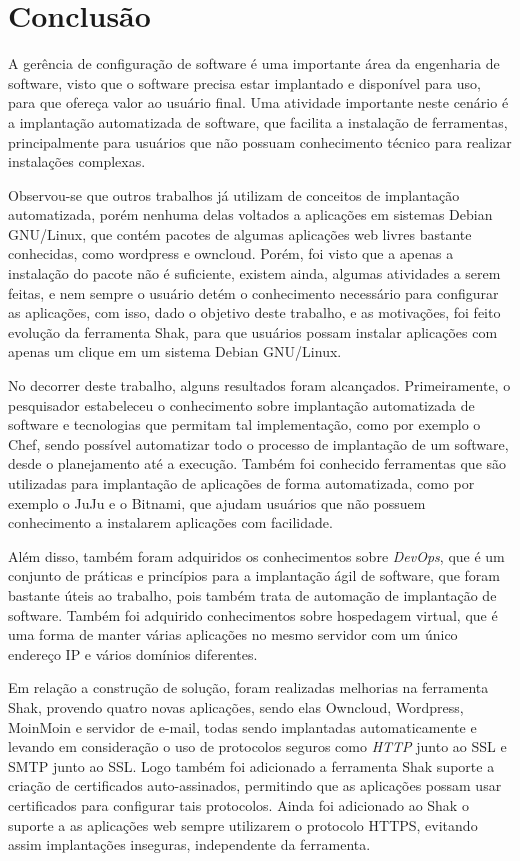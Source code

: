 \chapter{Conclusão}
\label{cap-conclusoes}

A gerência de configuração de software é uma importante área da engenharia de software,
visto que o software precisa estar implantado e disponível para uso, para que ofereça 
valor ao usuário final. Uma atividade importante neste cenário é a implantação
automatizada de software, que facilita a instalação de ferramentas, principalmente
para usuários que não possuam conhecimento técnico para realizar instalações complexas.

Observou-se que outros trabalhos já utilizam de conceitos de implantação automatizada,
porém nenhuma delas voltados a aplicações em sistemas Debian GNU/Linux, que contém
pacotes de algumas aplicações web livres bastante conhecidas, como wordpress e
owncloud. Porém, foi visto que a apenas a instalação do pacote não é suficiente, 
existem ainda, algumas atividades a serem feitas, e nem sempre o usuário detém
o conhecimento necessário para configurar as aplicações, com isso, dado o objetivo
deste trabalho, e as motivações, foi feito evolução da ferramenta Shak, para 
que usuários possam instalar aplicações com apenas um clique em um sistema Debian
GNU/Linux.

No decorrer deste trabalho, alguns resultados foram alcançados. Primeiramente, o
pesquisador estabeleceu o conhecimento sobre implantação automatizada
de software e tecnologias que permitam tal implementação, como por exemplo o Chef, 
sendo possível automatizar todo o processo de implantação de um software,
desde o planejamento até a execução. Também foi conhecido ferramentas que são
utilizadas para implantação de aplicações de forma automatizada, como por exemplo
o JuJu e o Bitnami, que ajudam usuários que não possuem conhecimento a
instalarem aplicações com facilidade.

Além disso, também foram adquiridos os conhecimentos sobre \textit{DevOps}, que é um conjunto
de práticas e princípios para a implantação ágil de software, que foram bastante 
úteis ao trabalho, pois também trata de automação de implantação de software. Também 
foi adquirido conhecimentos sobre hospedagem virtual, que é uma forma de manter
várias aplicações no mesmo servidor com um único endereço IP e vários domínios diferentes.

Em relação a construção de solução, foram realizadas melhorias na ferramenta Shak,
provendo quatro novas aplicações, sendo elas Owncloud, Wordpress, MoinMoin e 
servidor de e-mail, todas sendo implantadas automaticamente e 
levando em consideração o uso de protocolos seguros como \textit{HTTP} junto ao SSL e SMTP 
junto ao SSL. Logo também foi adicionado a
ferramenta Shak suporte a criação de certificados auto-assinados, permitindo que
as aplicações possam usar certificados para configurar tais protocolos. Ainda foi
adicionado ao Shak o suporte a as aplicações web sempre utilizarem
o protocolo HTTPS, evitando assim implantações inseguras, independente da ferramenta.

